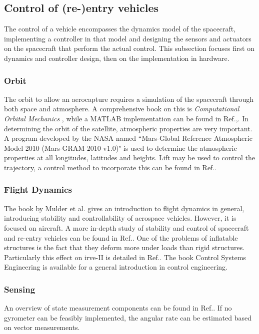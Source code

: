 \subsection{Control of (re-)entry vehicles} \label{sec:control}
The control of a vehicle encompasses the dynamics model of the spacecraft, implementing a controller in that model and designing the sensors and actuators on the spacecraft that perform the actual control. This subsection focuses first on dynamics and controller design, then on the implementation in hardware.

\subsubsection{Orbit}
The orbit to allow an aerocapture requires a simulation of the spacecraft through both space and atmosphere. A comprehensive book on this is \textit{Computational Orbital Mechanics} \cite{Weiland2004}, while a MATLAB implementation can be found in Ref.\cite{Leszczynski1998},. In determining the orbit of the satellite, atmospheric properties are very important. A program developed by the NASA named ``Mars-Global Reference Atmospheric Model 2010 (Mars-GRAM 2010 v1.0)" is used to determine the atmospheric properties at all longitudes, latitudes and heights.\cite{Justus2001} Lift may be used to control the trajectory, a control method to incorporate this can be found in Ref.\cite{Esmaelzadeh2010}.

\subsubsection{Flight Dynamics}
The book by Mulder et al. gives an introduction to flight dynamics in general, introducing stability and controllability of aerospace vehicles. However, it is focused on aircraft. \cite{Mulder2013} A more in-depth study of stability and control of spacecraft and re-entry vehicles can be found in Ref.\cite{Steketee1967, Ito2002}. One of the problems of inflatable structures is the fact that they deform more under loads than rigid structures.\cite{Axdahl2009} Particularly this effect on \gls{irve}-II is detailed in Ref.\cite{Bose2009}. The book Control Systems Engineering is available for a general introduction in control engineering.\cite{Nise2011}

\subsubsection{Sensing}
An overview of state measurement components can be found in Ref.\cite{Wertz2011}. If no gyrometer can be feasibly implemented, the angular rate can be estimated based on vector measurements.\cite{Azor1998}

